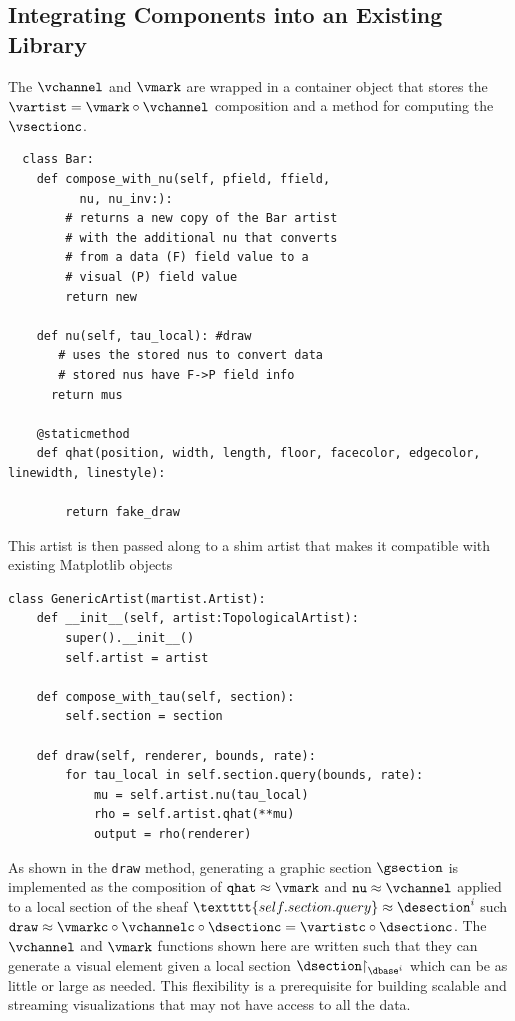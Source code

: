 \documentclass[10pt,journal,compsoc]{IEEEtran}
\renewcommand{\restriction}{\mathord{\upharpoonright}} %
\theoremstyle{definition}
\theoremstyle{remark}
\begin{document}
\subsection{Integrating Components into an Existing Library}
The $\vchannel$ and $\vmark$ are wrapped in a container object that stores the $\vartist = \vmark \circ \vchannel$ composition and a method for computing the $\vsectionc$.
\begin{verbatim}
  class Bar: 
    def compose_with_nu(self, pfield, ffield, 
          nu, nu_inv:):
        # returns a new copy of the Bar artist 
        # with the additional nu that converts 
        # from a data (F) field value to a 
        # visual (P) field value
        return new

    def nu(self, tau_local): #draw
       # uses the stored nus to convert data
       # stored nus have F->P field info
      return mus
    
    @staticmethod
    def qhat(position, width, length, floor, facecolor, edgecolor, linewidth, linestyle):
       
        return fake_draw
\end{verbatim}

This artist is then passed along to a shim artist that makes it compatible with existing Matplotlib objects
\begin{verbatim}
class GenericArtist(martist.Artist):
    def __init__(self, artist:TopologicalArtist):
        super().__init__()
        self.artist = artist
        
    def compose_with_tau(self, section):
        self.section = section

    def draw(self, renderer, bounds, rate):
        for tau_local in self.section.query(bounds, rate): 
            mu = self.artist.nu(tau_local)
            rho = self.artist.qhat(**mu)
            output = rho(renderer)
\end{verbatim}
As shown in the \texttt{draw} method, generating a graphic section $\gsection$ is implemented as the composition of $\texttt{qhat} \approx \vmark$ and $\texttt{nu} \approx \vchannel$ applied to a local section of the sheaf $\textttt{self.section.query} \approx \desection^{i}$ such  $\texttt{draw} \approx \vmarkc\circ\vchannelc\circ\dsectionc  = \vartistc\circ \dsectionc$. The $\vchannel$ and $\vmark$ functions shown here are written such that they can generate a visual element given a local section $\dsection\restriction_{\dbase^{i}}$ which can be as little or large as needed. This flexibility is a prerequisite for building scalable and streaming visualizations that may not have access to all the data.  
\end{document}

